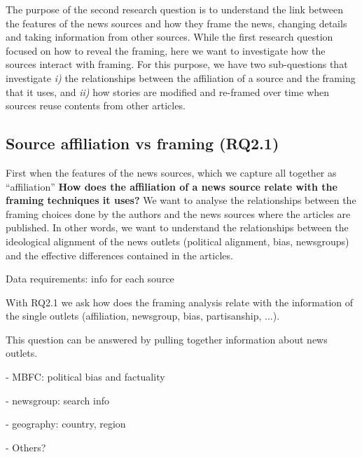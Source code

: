 The purpose of the second research question is to understand the link between the features of the news sources and how they frame the news, changing details and taking information from other sources.
While the first research question focused on how to reveal the framing, here we want to investigate how the sources interact with framing. For this purpose, we have two sub-questions that investigate \emph{i)} the relationships between the affiliation of a source and the framing that it uses, and \emph{ii)} how stories are modified and re-framed over time when sources reuse contents from other articles.

\subsection{Source affiliation vs framing (RQ2.1)}
First when 
the features of the news sources, which we capture all together as ``affiliation''
\textbf{How does the affiliation of a news source relate with the  framing techniques it uses?}
We want to analyse the relationships between the framing choices done by the authors and the news sources where the articles are published. In other words, we want to understand the relationships between the ideological alignment of the news outlets (political alignment, bias, newsgroups) and the effective differences contained in the articles.

Data requirements: info for each source




With RQ2.1 we ask how does the framing analysis relate with the information of the single outlets (affiliation, newsgroup, bias, partisanship, ...).


This question can be answered by pulling together information about news outlets.

- MBFC: political bias and factuality

- newsgroup: search info

- geography: country, region

- Others?


